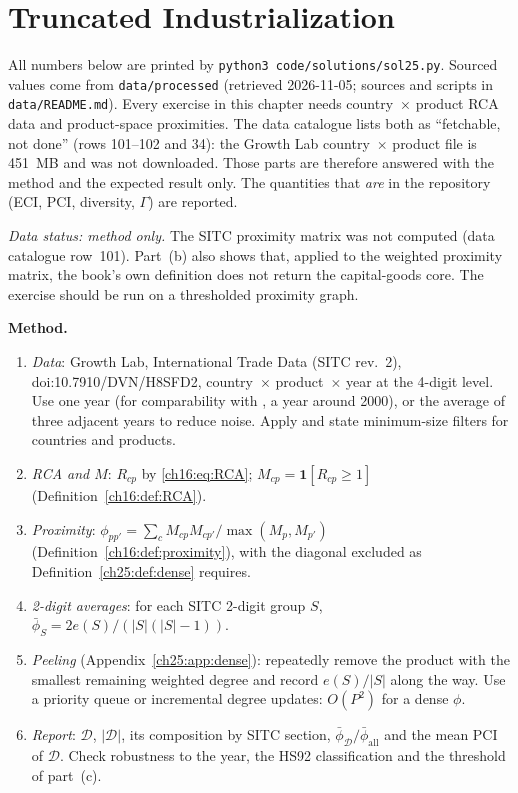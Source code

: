 \documentclass[../solutions_manual.tex]{subfiles}
\begin{document}
\ifSubfilesClassLoaded{\setcounter{chapter}{24}}{}%
\setcounter{chapter}{24}%
\chapter{Truncated Industrialization}\label{sol25}
\begingroup\sloppy

All numbers below are printed by \texttt{python3 code/solutions/sol25.py}. Sourced values come from \texttt{data/processed} (retrieved 2026-11-05; sources and scripts in \texttt{data/README.md}). Every exercise in this chapter needs country~$\times$ product RCA data and product-space proximities. The data catalogue lists both as ``fetchable, not done'' (rows 101--102 and 34): the Growth Lab country~$\times$ product file is 451~MB and was not downloaded. Those parts are therefore answered with the method and the expected result only. The quantities that \emph{are} in the repository (ECI, PCI, diversity, $\Gamma$) are reported.


\emph{Data status: method only.} The SITC proximity matrix was not computed (data catalogue row~101). Part~(b) also shows that, applied to the weighted proximity matrix, the book's own definition does not return the capital-goods core. The exercise should be run on a thresholded proximity graph.

 \textbf{Method.}
\begin{enumerate}
\item \emph{Data}: Growth Lab, International Trade Data (SITC rev.~2), doi:10.7910/DVN/H8SFD2, country~$\times$ product~$\times$ year at the 4-digit level. Use one year (for comparability with \citealp{hidalgo2007product}, a year around 2000), or the average of three adjacent years to reduce noise. Apply and state minimum-size filters for countries and products.
\item \emph{RCA and $M$}: $R_{cp}$ by \eqref{ch16:eq:RCA}; $M_{cp} = \mathbf{1}[R_{cp} \ge 1]$ (Definition~\ref{ch16:def:RCA}).
\item \emph{Proximity}: $\phi_{pp'} = \sum_c M_{cp}M_{cp'}/\max(M_p, M_{p'})$ (Definition~\ref{ch16:def:proximity}), with the diagonal excluded as Definition~\ref{ch25:def:dense} requires.
\item \emph{2-digit averages}: for each SITC 2-digit group $S$, $\bar\phi_S = 2e(S)/(|S|(|S|-1))$.
\item \emph{Peeling} (Appendix~\ref{ch25:app:dense}): repeatedly remove the product with the smallest remaining weighted degree and record $e(S)/|S|$ along the way. Use a priority queue or incremental degree updates: $O(P^2)$ for a dense $\phi$.
\item \emph{Report}: $\mathcal{D}$, $|\mathcal{D}|$, its composition by SITC section, $\bar\phi_{\mathcal{D}}/\bar\phi_{\text{all}}$ and the mean PCI of $\mathcal{D}$. Check robustness to the year, the HS92 classification and the threshold of part~(c).
\end{enumerate}
\end{document}
